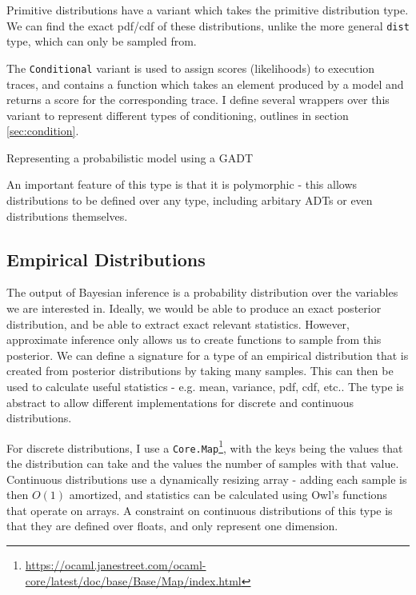 \documentclass[sigconf]{acmart}
\begin{document}
Primitive distributions have a variant which takes the primitive distribution type. We can find the exact pdf/cdf of these distributions, unlike the more general \texttt{dist} type, which can only be sampled from.

The \texttt{Conditional} variant is used to assign scores (likelihoods) to execution traces, and contains a function which takes an element produced by a model and returns a score for the corresponding trace. I define several wrappers over this variant to represent different types of conditioning, outlines in section \ref{sec:condition}.

\begin{listing}[!ht]
  \caption{Representing a probabilistic model using a GADT}
  \label{lst:gadt1}
\end{listing}

An important feature of this type is that it is polymorphic - this allows distributions to be defined over any type, including arbitary ADTs or even distributions themselves.

\subsection{Empirical Distributions}

The output of Bayesian inference is a probability distribution over the variables we are interested in. Ideally, we would be able to produce an exact posterior distribution, and be able to extract exact relevant statistics. However, approximate inference only allows us to create functions to sample from this posterior. We can define a signature for a type of an empirical distribution that is created from posterior distributions by taking many samples. This can then be used to calculate useful statistics - e.g. mean, variance, pdf, cdf, etc.. The type is abstract to allow different implementations for discrete and continuous distributions.

For discrete distributions, I use a \texttt{Core.Map}\footnote{\url{https://ocaml.janestreet.com/ocaml-core/latest/doc/base/Base/Map/index.html}}, with the keys being the values that the distribution can take and the values the number of samples with that value. Continuous distributions use a dynamically resizing array - adding each sample is then $O(1)$ amortized, and statistics can be calculated using Owl's functions that operate on arrays. A constraint on continuous distributions of this type is that they are defined over floats, and only represent one dimension.
\end{document}
